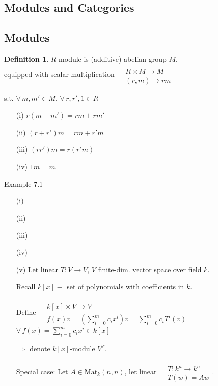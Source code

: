 \documentclass[twoside,landscape]{amsart}
\theoremstyle{plain}
\theoremstyle{definition}
\newtheorem{definition}{Definition}
\theoremstyle{remark}
\begin{document}
\begin{multicols*}{2}
\section{Modules and Categories }

\subsection{Modules}

\begin{definition}
  $R$-module is (additive) abelian group $M$, \\
equipped with scalar multiplication $\begin{aligned} & \quad \\
  & R \times M \to M \\
  & (r,m) \mapsto rm \end{aligned}$ 

s.t. $\forall \, m,m' \in M$, $\forall \, r,r',1 \in R$
\begin{enumerate}
  \item[(i)] $r(m+m')=rm+rm'$
  \item[(ii)] $(r+r')m = rm+r'm$
  \item[(iii)] $(rr')m = r(r'm)$
  \item[(iv)] $1m = m$
\end{enumerate}
\end{definition}

Example 7.1 \begin{enumerate}
\item[(i)]
\item[(ii)]
\item[(iii)]
\item[(iv)]
\item[(v)] Let linear $T:V \to V$, $V$ finite-dim. vector space over field $k$.  

Recall $k[x] \equiv $ set of polynomials with coefficients in $k$.  

Define $\begin{aligned} & \quad \\
  & k[x] \times V \to V \\
  & f(x)v =\left(\sum_{i=0}^m c_i x^i\right)v =\sum_{i=0}^m c_iT^i(v) \end{aligned}$ \quad \, $\forall \, f(x) = \sum_{i=0}^m c_ix^i \in k[x]$

$\Longrightarrow $ denote $k[x]$-module $V^T$.  

Special case: Let $A \in \text{Mat}_k(n,n)$, let linear $\begin{aligned} & \quad \\
  & T :k^n \to k^n \\
  & T(w) = Aw \end{aligned}$.  


\end{enumerate}
\end{multicols*}
\end{document}
